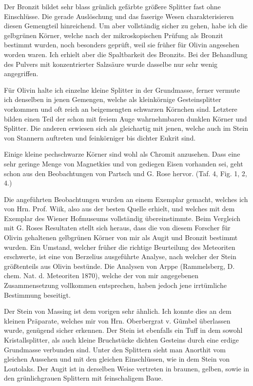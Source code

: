 \documentclass[a4paper, 11pt, oneside, polutonikogreek, german]{article}
\begin{document}
Der Bronzit bildet sehr blass grünlich gefärbte größere Splitter fast ohne Einschlüsse. Die gerade Auslöschung und das faserige Wesen charakterisieren diesen Gemengteil hinreichend. Um aber vollständig sicher zu gehen, habe ich die gelbgrünen Körner, welche nach der mikroskopischen Prüfung als Bronzit bestimmt wurden, noch besonders geprüft, weil sie früher für Olivin angesehen worden waren. Ich erhielt aber die Spaltbarkeit des Bronzits. Bei der Behandlung des Pulvers mit konzentrierter Salzsäure wurde dasselbe nur sehr wenig angegriffen.

Für Olivin halte ich einzelne kleine Splitter in der Grundmasse, ferner vermute ich denselben in jenen Gemengen, welche als kleinkörnige Gesteinsplitter vorkommen und oft reich an beigemengten schwarzen Körnchen sind. Letztere bilden einen Teil der schon mit freiem Auge wahrnehmbaren dunklen Körner und Splitter. Die anderen erwiesen sich als gleichartig mit jenen, welche auch im Stein von Stannern auftreten und feinkörniger bis dichter Eukrit sind.

Einige kleine pechschwarze Körner sind wohl als Chromit anzusehen. Dass eine sehr geringe Menge von Magnetkies und von gediegen Eisen vorhanden sei, geht schon aus den Beobachtungen von Partsch und G. Rose hervor. (Taf. 4, Fig. 1, 2, 4.)

Die angeführten Beobachtungen wurden an einem Exemplar gemacht, welches ich von Hrn. Prof. Wiik, also aus der besten Quelle erhielt, und welches mit dem Exemplar des Wiener Hofmuseums vollständig übereinstimmte. Beim Vergleich mit G. Roses Resultaten stellt sich heraus, dass die von diesem Forscher für Olivin gehaltenen gelbgrünen Körner von mir als Augit und Bronzit bestimmt wurden. Ein Umstand, welcher früher die richtige Beurteilung des Meteoriten erschwerte, ist eine von Berzelius ausgeführte Analyse, nach welcher der Stein größtenteils aus Olivin bestünde. Die Analysen von Arppe (Rammelsberg, D. chem. Nat. d. Meteoriten 1870), welche der von mir angegebenen Zusammensetzung vollkommen entsprechen, haben jedoch jene irrtümliche Bestimmung beseitigt.

Der Stein von Massing ist dem vorigen sehr ähnlich. Ich konnte dies an dem kleinen Präparate, welches mir von Hrn. Oberbergrat v. Gümbel überlassen wurde, genügend sicher erkennen. Der Stein ist ebenfalls ein Tuff in dem sowohl Kristallsplitter, als auch kleine Bruchstücke dichten Gesteins durch eine erdige Grundmasse verbunden sind. Unter den Splittern sieht man Anorthit vom gleichen Aussehen und mit den gleichen Einschlüssen, wie in dem Stein von Loutolaks. Der Augit ist in derselben Weise vertreten in braunen, gelben, sowie in den grünlichgrauen Splittern mit feinschaligem Baue.
\end{document}
